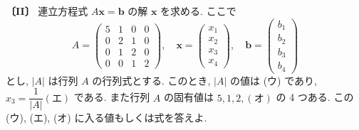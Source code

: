 \noindent\textbf{〔II〕}
連立方程式 $A\bm{x}=\bm{b}$ の解 $\bm{x}$ を求める. ここで
\[
A=\begin{pmatrix}
5 & 1 & 0 & 0\\
0 & 2 & 1 & 0\\
0 & 1 & 2 & 0\\
0 & 0 & 1 & 2
\end{pmatrix},\quad
\bm{x}=\begin{pmatrix}x_1\\x_2\\x_3\\x_4\end{pmatrix},\quad
\bm{b}=\begin{pmatrix}b_1\\b_2\\b_3\\b_4\end{pmatrix}
\]
とし, $|A|$ は行列 $A$ の行列式とする. このとき, $|A|$ の値は (ウ) であり,
$x_3=\dfrac{1}{|A|}(\text{エ})$ である. また行列 $A$ の固有値は $5,1,2,(\text{オ})$ の 4 つある.
この (ウ), (エ), (オ) に入る値もしくは式を答えよ.
